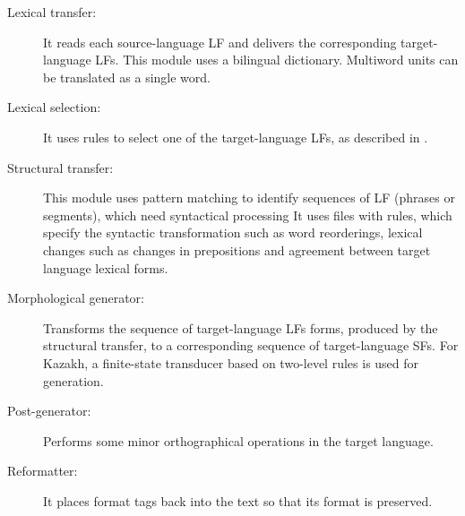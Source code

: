 \documentclass[11pt]{article}
\begin{document}
\begin{description}
\item[Lexical transfer:] It reads each source-language LF and delivers the corresponding target-language 
  LFs. This module uses a bilingual dictionary. 
 Multiword units can be translated as a single word.
\item[ Lexical selection:] It uses rules to select one of the target-language LFs, as described in \cite{tyers12a}.
\item [Structural transfer:] This module uses pattern matching to identify sequences of LF (phrases or 
  segments), which need syntactical processing 
It uses files with rules, which specify  the syntactic transformation such as word reorderings, 
  lexical changes such as changes in prepositions and agreement between target language lexical forms. %
\item[Morphological generator:] Transforms the sequence of target-language LFs forms, produced by the structural transfer, 
  to a corresponding sequence of target-language SFs. 
For Kazakh, a finite-state transducer based on two-level rules \citep{washingtonsalimzyantyers14} is used for generation. 
\item[Post-generator:] Performs some minor orthographical operations in the target language. 
\item[ Reformatter:] It places format tags back into the text so that its format is preserved.
\end{description}
\end{document}
